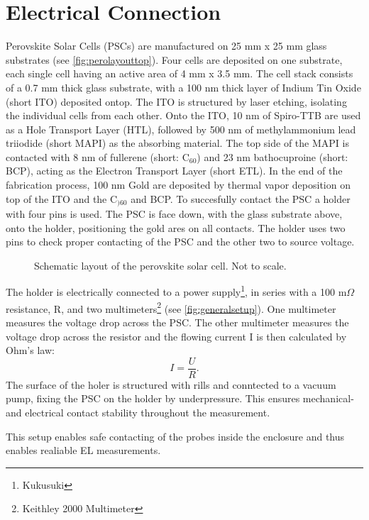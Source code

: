 \section{Electrical Connection}\label{sec:electricalconnection}
Perovskite Solar Cells (PSCs) are manufactured on 25 mm x 25 mm glass substrates (see \autoref{fig:perolayouttop}). Four cells are deposited on one substrate, each single cell having an active area of 4 mm x 3.5 mm. The cell stack consists of a 0.7 mm thick glass substrate, with a 100 nm thick layer of Indium Tin Oxide (short ITO) deposited ontop. The ITO is structured by laser etching, isolating the individual cells from each other. Onto the ITO, 10 nm of Spiro-TTB are used as a Hole Transport Layer (HTL), followed by 500 nm of methylammonium lead triiodide (short MAPI) as the absorbing material. The top side of the MAPI is contacted with 8 nm of fullerene (short: C$_{60}$) and 23 nm bathocuproine (short: BCP), acting as the Electron Transport Layer (short ETL). In the end of the fabrication process, 100 nm Gold are deposited by thermal vapor deposition on top of the ITO and the C$_{)60}$ and BCP. To succesfully contact the PSC a holder with four pins is used. The PSC is face down, with the glass substrate above, onto the holder, positioning the gold ares on all contacts. The holder uses two pins to check proper contacting of the PSC and the other two to source voltage.
\begin{figure}
	\centering
	
	\caption{Schematic layout of the perovskite solar cell. Not to scale.}
	\label{fig:perolayouttop}
\end{figure}

The holder is electrically connected to a power supply\footnote{Kukusuki}, in series with a 100 m$\Omega$ resistance, R, and two multimeters\footnote{Keithley 2000 Multimeter} (see \autoref{fig:generalsetup}). One multimeter measures the voltage drop across the PSC. The other multimeter measures the voltage drop across the resistor and the flowing current I is then calculated by Ohm's law:
\begin{equation}
	I = \frac{U}{R}.
\end{equation}
The surface of the holer is structured with rills and conntected to a vacuum pump, fixing the PSC on the holder by underpressure. This ensures mechanical- and electrical contact stability throughout the measurement.

This setup enables safe contacting of the probes inside the enclosure and thus enables realiable EL measurements.

